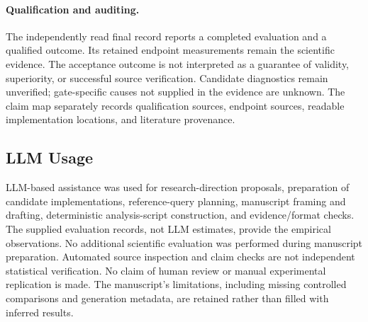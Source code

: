 \documentclass{article}
\begin{document}
\paragraph{Qualification and auditing.}
The independently read final record reports a completed evaluation and a qualified outcome. Its retained endpoint measurements remain the scientific evidence. The acceptance outcome is not interpreted as a guarantee of validity, superiority, or successful source verification. Candidate diagnostics remain unverified; gate-specific causes not supplied in the evidence are unknown. The claim map separately records qualification sources, endpoint sources, readable implementation locations, and literature provenance.

\subsection{LLM Usage}
LLM-based assistance was used for research-direction proposals, preparation of candidate implementations, reference-query planning, manuscript framing and drafting, deterministic analysis-script construction, and evidence/format checks. The supplied evaluation records, not LLM estimates, provide the empirical observations. No additional scientific evaluation was performed during manuscript preparation. Automated source inspection and claim checks are not independent statistical verification. No claim of human review or manual experimental replication is made. The manuscript's limitations, including missing controlled comparisons and generation metadata, are retained rather than filled with inferred results.
\end{document}
